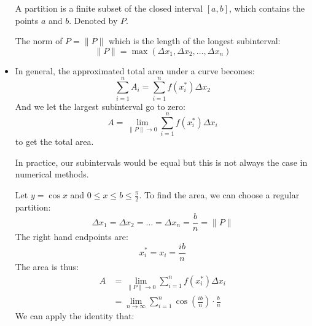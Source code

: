 \begin{itemize}
\begin{example}
    \end{example}
    \begin{definition}
        A partition is a finite subset of the closed interval $[a,b]$, which contains the points $a$ and $b$. Denoted by $P$.
    \end{definition}
    \begin{definition}
        The norm of $P=\lVert P \rVert$ which is the length of the longest subinterval:
        \begin{equation}
            \lVert P \rVert = \max\left(\Delta x_1, \Delta x_2, \dots , \Delta x_n\right)
        \end{equation}
    \end{definition}
    \item In general, the approximated total area under a curve becomes:
    \begin{equation}
        \sum_{i=1}^n A_i = \sum_{i=1}^n f(x_i^*)\Delta x_2
    \end{equation}
    And we let the largest subinterval go to zero:
    \begin{equation}
        A = \lim_{\lVert P \rVert \to 0} \sum_{i=1}^n f(x_i^*)\Delta x_i
        \label{eq:}
    \end{equation}
    to get the total area.
    \begin{idea}
        In practice, our subintervals would be equal but this is not always the case in numerical methods.
    \end{idea}
    \begin{example}
        Let $y=\cos x$ and $0\le x\le b\le \frac{\pi}{2}$. To find the area, we can choose a regular partition:
        \begin{equation}
            \Delta x_1= \Delta x_2 = \dots = \Delta x_n = \frac{b}{n} = \lVert P \rVert
            \label{eq:}
        \end{equation}
        The right hand endpoints are:
        \begin{equation}
            x_i^*=x_i=\frac{ib}{n}
            \label{eq:}
        \end{equation}
        The area is thus:
        \begin{align}
            A &= \lim_{\lVert P \rVert \to 0} \sum_{i=1}^n f(x_i^*)\Delta x_i \\ 
            &= \lim_{n\to \infty}\sum_{i=1}^n \cos\left(\frac{ib}{n}\right)\cdot \frac{b}{n}
            \label{eq:}
        \end{align}
        We can apply the identity that:

\end{example}
\end{itemize}
